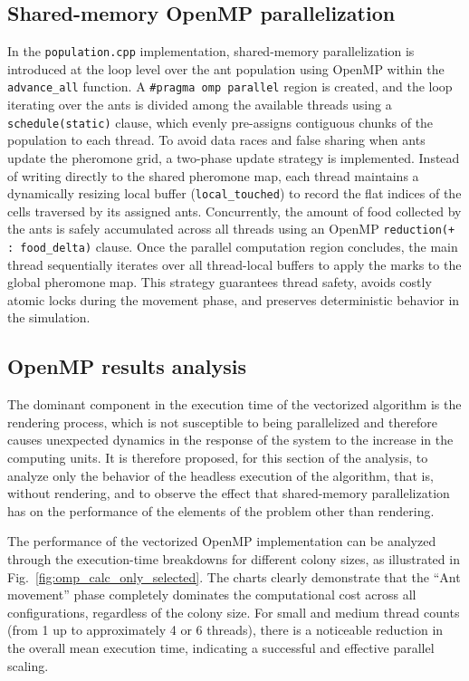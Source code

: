 \subsection{Shared-memory OpenMP parallelization}

In the \texttt{population.cpp} implementation, shared-memory parallelization is introduced at the loop level over the ant population using OpenMP within the \texttt{advance\_all} function.
A \texttt{\#pragma omp parallel} region is created, and the loop iterating over the ants is divided among the available threads using a \texttt{schedule(static)} clause, which evenly pre-assigns contiguous chunks of the population to each thread.
To avoid data races and false sharing when ants update the pheromone grid, a two-phase update strategy is implemented.
Instead of writing directly to the shared pheromone map, each thread maintains a dynamically resizing local buffer (\texttt{local\_touched}) to record the flat indices of the cells traversed by its assigned ants.
Concurrently, the amount of food collected by the ants is safely accumulated across all threads using an OpenMP \texttt{reduction(+ : food\_delta)} clause.
Once the parallel computation region concludes, the main thread sequentially iterates over all thread-local buffers to apply the marks to the global pheromone map. This strategy guarantees thread safety, avoids costly atomic locks during the movement phase, and preserves deterministic behavior in the simulation.

\subsection{OpenMP results analysis}
The dominant component in the execution time of the vectorized algorithm is the rendering process, which is not susceptible to being parallelized and therefore causes unexpected dynamics in the response of the system to the increase in the computing units. It is therefore proposed, for this section of the analysis, to analyze only the behavior of the headless execution of the algorithm, that is, without rendering, and to observe the effect that shared-memory parallelization has on the performance of the elements of the problem other than rendering.

The performance of the vectorized OpenMP implementation can be analyzed through the execution-time breakdowns for different colony sizes, as illustrated in Fig.~\ref{fig:omp_calc_only_selected}.
The charts clearly demonstrate that the ``Ant movement'' phase completely dominates the computational cost across all configurations, regardless of the colony size.
For small and medium thread counts (from 1 up to approximately 4 or 6 threads), there is a noticeable reduction in the overall mean execution time, indicating a successful and effective parallel scaling.

